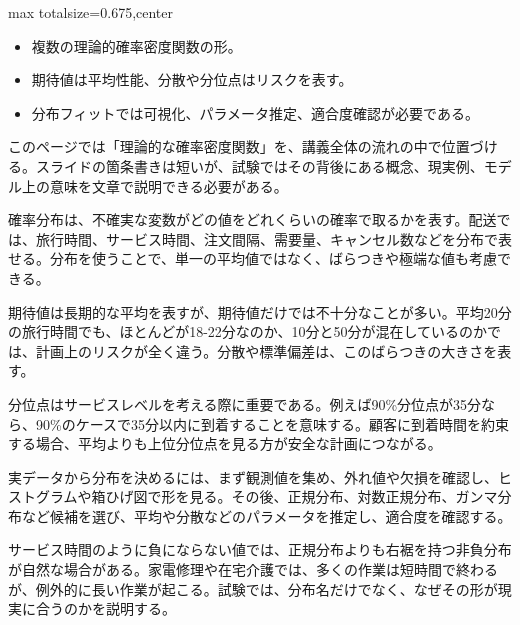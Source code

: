 \clearpage
{}
\begin{adjustbox}{max totalsize={\textwidth}{0.675\textheight},center}
\begin{minipage}{\textwidth}\scriptsize
\begin{minipage}[t]{0.485\textwidth}
\begin{itemize}
\item 複数の理論的確率密度関数の形。
\end{itemize}
\begin{itemize}
\item 期待値は平均性能、分散や分位点はリスクを表す。
\item 分布フィットでは可視化、パラメータ推定、適合度確認が必要である。
\end{itemize}
\end{minipage}\hfill
\begin{minipage}[t]{0.485\textwidth}
このページでは「理論的な確率密度関数」を、講義全体の流れの中で位置づける。スライドの箇条書きは短いが、試験ではその背後にある概念、現実例、モデル上の意味を文章で説明できる必要がある。\par
確率分布は、不確実な変数がどの値をどれくらいの確率で取るかを表す。配送では、旅行時間、サービス時間、注文間隔、需要量、キャンセル数などを分布で表せる。分布を使うことで、単一の平均値ではなく、ばらつきや極端な値も考慮できる。\par
期待値は長期的な平均を表すが、期待値だけでは不十分なことが多い。平均20分の旅行時間でも、ほとんどが18-22分なのか、10分と50分が混在しているのかでは、計画上のリスクが全く違う。分散や標準偏差は、このばらつきの大きさを表す。\par
分位点はサービスレベルを考える際に重要である。例えば90\%分位点が35分なら、90\%のケースで35分以内に到着することを意味する。顧客に到着時間を約束する場合、平均よりも上位分位点を見る方が安全な計画につながる。\par
実データから分布を決めるには、まず観測値を集め、外れ値や欠損を確認し、ヒストグラムや箱ひげ図で形を見る。その後、正規分布、対数正規分布、ガンマ分布など候補を選び、平均や分散などのパラメータを推定し、適合度を確認する。\par
サービス時間のように負にならない値では、正規分布よりも右裾を持つ非負分布が自然な場合がある。家電修理や在宅介護では、多くの作業は短時間で終わるが、例外的に長い作業が起こる。試験では、分布名だけでなく、なぜその形が現実に合うのかを説明する。\par

\end{minipage}
\end{minipage}
\end{adjustbox}
